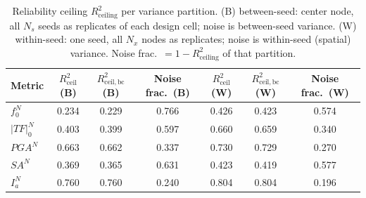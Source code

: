 \begin{table}[!ht]
\caption{Reliability ceiling $R^2_{\mathrm{ceiling}}$ per variance partition. (B) between-seed: center node, all $N_s$ seeds as replicates of each design cell; noise is between-seed variance. (W) within-seed: one seed, all $N_x$ nodes as replicates; noise is within-seed (spatial) variance. Noise frac.\ $=1-R^2_{\mathrm{ceiling}}$ of that partition.\label{tab:r_ceiling}}
\begin{tabular*}{\textwidth}{@{\extracolsep{\fill}}lcccccc@{}}
\toprule
Metric & $R^2_{\mathrm{ceil}}$ (B) & $R^2_{\mathrm{ceil,bc}}$ (B) & Noise frac.\ (B) & $R^2_{\mathrm{ceil}}$ (W) & $R^2_{\mathrm{ceil,bc}}$ (W) & Noise frac.\ (W) \\
\midrule
$f_0^N$ & 0.234 & 0.229 & 0.766 & 0.426 & 0.423 & 0.574 \\
$\lvert TF\rvert_0^N$ & 0.403 & 0.399 & 0.597 & 0.660 & 0.659 & 0.340 \\
$PGA^N$ & 0.663 & 0.662 & 0.337 & 0.730 & 0.729 & 0.270 \\
$SA^N$ & 0.369 & 0.365 & 0.631 & 0.423 & 0.419 & 0.577 \\
$I_a^N$ & 0.760 & 0.760 & 0.240 & 0.804 & 0.804 & 0.196 \\
\bottomrule
\end{tabular*}
\end{table}
